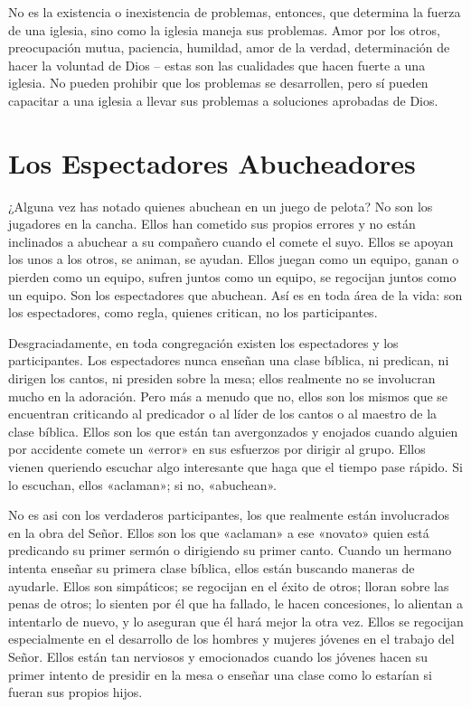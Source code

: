 \documentclass[12pt, twoside, openright]{book}
\begin{document}
No es la existencia o inexistencia de problemas, entonces, que determina la fuerza de una iglesia, sino como la iglesia maneja sus problemas. Amor por los otros, preocupación mutua, paciencia, humildad, amor de la verdad, determinación de hacer la voluntad de Dios – estas son las cualidades que hacen fuerte a una iglesia. No pueden prohibir que los problemas se desarrollen, pero sí pueden capacitar a una iglesia a llevar sus problemas a soluciones aprobadas de Dios.

\section{Los Espectadores Abucheadores}
¿Alguna vez has notado quienes abuchean en un juego de pelota? No son los jugadores en la cancha. Ellos han cometido sus propios errores y no están inclinados a abuchear a su compañero cuando el comete el suyo. Ellos se apoyan los unos a los otros, se animan, se ayudan. Ellos juegan como un equipo, ganan o pierden como un equipo, sufren juntos como un equipo, se regocijan juntos como un equipo. Son los espectadores que abuchean. Así es en toda área de la vida: son los espectadores, como regla, quienes critican, no los participantes. 

Desgraciadamente, en toda congregación existen los espectadores y los participantes. Los espectadores nunca enseñan una clase bíblica, ni predican, ni dirigen los cantos, ni presiden sobre la mesa; ellos realmente no se involucran mucho en la adoración. Pero más a menudo que no, ellos son los mismos que se encuentran criticando al predicador o al líder de los cantos o al maestro de la clase bíblica. Ellos son los que están tan avergonzados y enojados cuando alguien por accidente comete un «error» en sus esfuerzos por dirigir al grupo. Ellos vienen queriendo escuchar algo interesante que haga que el tiempo pase rápido. Si lo escuchan, ellos «aclaman»; si no, «abuchean».

No es asi con los verdaderos participantes, los que realmente están involucrados en la obra del Señor. Ellos son los que «aclaman» a ese «novato» quien está predicando su primer sermón o dirigiendo su primer canto. Cuando un hermano intenta enseñar su primera clase bíblica, ellos están buscando maneras de ayudarle. Ellos son simpáticos; se regocijan en el éxito de otros; lloran sobre las penas de otros; lo sienten por él que ha fallado, le hacen concesiones, lo alientan a intentarlo de nuevo, y lo aseguran que él hará mejor la otra vez. Ellos se regocijan especialmente en el desarrollo de los hombres y mujeres jóvenes en el trabajo del Señor. Ellos están tan nerviosos y emocionados cuando los jóvenes hacen su primer intento de presidir en la mesa o enseñar una clase como lo estarían si fueran sus propios hijos. 
\end{document}
